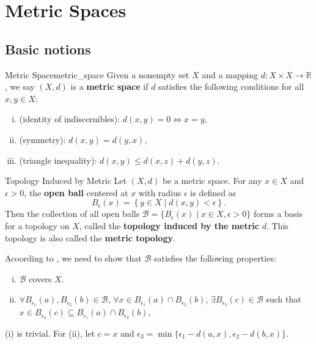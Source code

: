 \documentclass{report}
\begin{document}
\section{Metric Spaces}
\subsection{Basic notions}
\begin{definition}{Metric Space}{metric_space}
	Given a nonempty set $X$ and a mapping $d:X\times X\to \mathbb{R}$, we say $(X,d)$ is a \textbf{metric space} if $d$ satisfies the following conditions for all $x,y\in X$:
	\begin{enumerate}[(i)]
		\item (identity of indiscernibles): $d(x,y)=0\iff x=y$,
		\item (symmetry): $d(x,y)=d(y,x)$,
		\item (triangle inequality): $d(x,y)\le d(x,z)+d(y,z)$.
	\end{enumerate}
\end{definition}

\begin{definition}{Topology Induced by Metric}
	Let $(X,d)$ be a metric space. For any $x\in X$ and $\epsilon>0$, the \textbf{open ball} centered at $x$ with radius $\epsilon$ is defined as
	\[
		B_\epsilon(x)=\left\{y\in X\mid d(x,y)<\epsilon\right\}.
	\]
	Then the collection of all open balls $\mathcal{B}=\{B_\epsilon(x)\mid x\in X,\epsilon>0\}$ forms a basis for a topology on $X$, called the \textbf{topology induced by the metric} $d$. This topology is also called the \textbf{metric topology}.
\end{definition}
\begin{prf}
	Acoording to , we need to show that $\mathcal{B}$ satisfies the following properties:
	\begin{enumerate}[(i)]
		\item $\mathcal{B}$ covers $X$.
		\item $\forall B_{\epsilon_1}(a),B_{\epsilon_2}(b)\in\mathcal{B}$, $\forall x\in B_{\epsilon_1}(a)\cap B_{\epsilon_2}(b)$, $\exists B_{\epsilon_3}(c)\in \mathcal{B}$ such that $x\in B_{\epsilon_3}(c)\subseteq B_{\epsilon_1}(a)\cap B_{\epsilon_2}(b)$,
	\end{enumerate}
	(i) is trivial. For (ii), let $c=x$ and $\epsilon_3=\min\{\epsilon_1-d(a,x),\epsilon_2-d(b,x)\}$.
\end{prf}
\end{document}
